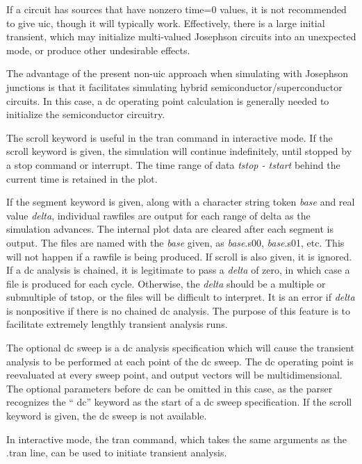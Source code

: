 If a circuit has sources that have nonzero time=0 values, it is not
recommended to give {\vt uic}, though it will typically work. 
Effectively, there is a large initial transient, which may initialize
multi-valued Josephson circuits into an unexpected mode, or produce
other undesirable effects.

The advantage of the present non-uic approach when simulating with
Josephson junctions is that it facilitates simulating hybrid
semiconductor/superconductor circuits.  In this case, a dc operating
point calculation is generally needed to initialize the semiconductor
circuitry.

The {\vt scroll} keyword is useful in the {\cb tran} command in
interactive mode.  If the {\vt scroll} keyword is given, the
simulation will continue indefinitely, until stopped by a {\cb stop}
command or interrupt.  The time range of data {\it tstop - tstart}
behind the current time is retained in the plot.

If the {\vt segment} keyword is given, along with a character string
token {\it base} and real value {\it delta}, individual rawfiles are
output for each range of delta as the simulation advances.  The
internal plot data are cleared after each segment is output.  The
files are named with the {\it base} given, as {\it base\/}.{\vt s00},
{\it base\/}.{\vt s01}, etc.  This will not happen if a rawfile is
being produced.  If {\vt scroll} is also given, it is ignored.  If a
dc analysis is chained, it is legitimate to pass a {\it delta} of
zero, in which case a file is produced for each cycle.  Otherwise, the
{\it delta} should be a multiple or submultiple of {\vt tstop}, or the
files will be difficult to interpret.  It is an error if {\it delta}
is nonpositive if there is no chained dc analysis.  The purpose of
this feature is to facilitate extremely lengthly transient analysis
runs.

The optional dc sweep is a dc analysis specification which will cause
the transient analysis to be performed at each point of the dc sweep. 
The dc operating point is reevaluated at every sweep point, and output
vectors will be multidimensional.  The optional parameters before {\vt
dc} can be omitted in this case, as the parser recognizes the ``{\vt
dc}'' keyword as the start of a dc sweep specification.  If the {\vt
scroll} keyword is given, the dc sweep is not available.

In interactive mode, the {\cb tran} command, which takes the same
arguments as the {\vt .tran} line, can be used to initiate transient
analysis.

